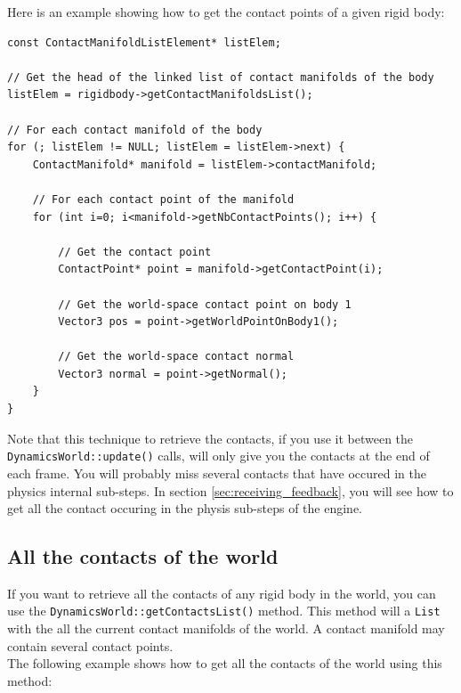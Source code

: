 \documentclass[a4paper,12pt]{article}
\begin{document}
    Here is an example showing how to get the contact points of a given rigid body: \\

    \begin{lstlisting}
const ContactManifoldListElement* listElem;

// Get the head of the linked list of contact manifolds of the body
listElem = rigidbody->getContactManifoldsList();

// For each contact manifold of the body
for (; listElem != NULL; listElem = listElem->next) {
    ContactManifold* manifold = listElem->contactManifold;

    // For each contact point of the manifold
    for (int i=0; i<manifold->getNbContactPoints(); i++) {

        // Get the contact point
        ContactPoint* point = manifold->getContactPoint(i);

        // Get the world-space contact point on body 1
        Vector3 pos = point->getWorldPointOnBody1();

        // Get the world-space contact normal
        Vector3 normal = point->getNormal();
    }
}
    \end{lstlisting}

     \vspace{0.6cm}

    Note that this technique to retrieve the contacts, if you use it between the \texttt{DynamicsWorld::update()} calls, will only give you the contacts at the end of
    each frame. You will probably miss several contacts that have occured in the physics internal sub-steps. In section \ref{sec:receiving_feedback}, you will
    see how to get all the contact occuring in the physis sub-steps of the engine. 

    \subsection{All the contacts of the world}

    If you want to retrieve all the contacts of any rigid body in the world, you can use the \texttt{DynamicsWorld::getContactsList()} method. This method will
    a \texttt{List} with the all the current contact manifolds of the world. A contact manifold may contain several contact points. \\

    The following example shows how to get all the contacts of the world using this method: \\
\end{document}
